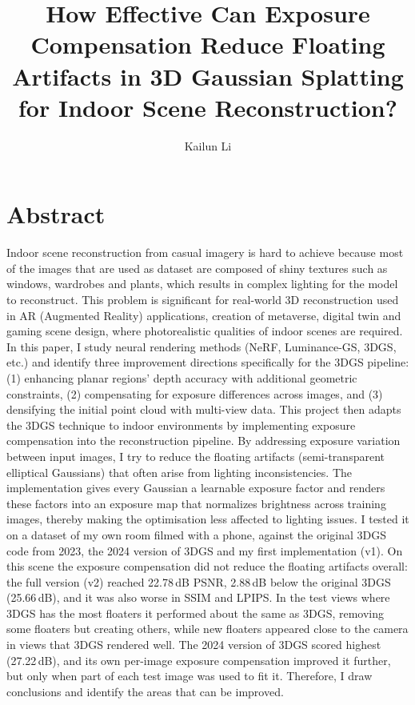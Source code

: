 \documentclass[11pt,a4paper]{article}
\title{How Effective Can Exposure Compensation Reduce Floating Artifacts in 3D Gaussian Splatting for Indoor Scene Reconstruction?}
\author{Kailun Li}
\date{}
\begin{document}
\maketitle
\thispagestyle{empty}

\tableofcontents
\clearpage

\section{Abstract}

Indoor scene reconstruction from casual imagery is hard to achieve because most of the images that are used as dataset are composed of shiny textures such as windows, wardrobes and plants, which results in complex lighting for the model to reconstruct. This problem is significant for real-world 3D reconstruction used in AR (Augmented Reality) applications, creation of metaverse, digital twin and gaming scene design, where photorealistic qualities of indoor scenes are required. In this paper, I study neural rendering methods (NeRF, Luminance-GS, 3DGS, etc.) and identify three improvement directions specifically for the 3DGS pipeline: (1) enhancing planar regions' depth accuracy with additional geometric constraints, (2) compensating for exposure differences across images, and (3) densifying the initial point cloud with multi-view data. This project then adapts the 3DGS technique to indoor environments by implementing exposure compensation into the reconstruction pipeline. By addressing exposure variation between input images, I try to reduce the floating artifacts (semi-transparent elliptical Gaussians) that often arise from lighting inconsistencies. The implementation gives every Gaussian a learnable exposure factor and renders these factors into an exposure map that normalizes brightness across training images, thereby making the optimisation less affected to lighting issues. I tested it on a dataset of my own room filmed with a phone, against the original 3DGS code from 2023, the 2024 version of 3DGS and my first implementation (v1). On this scene the exposure compensation did not reduce the floating artifacts overall: the full version (v2) reached 22.78\,dB PSNR, 2.88\,dB below the original 3DGS (25.66\,dB), and it was also worse in SSIM and LPIPS. In the test views where 3DGS has the most floaters it performed about the same as 3DGS, removing some floaters but creating others, while new floaters appeared close to the camera in views that 3DGS rendered well. The 2024 version of 3DGS scored highest (27.22\,dB), and its own per-image exposure compensation improved it further, but only when part of each test image was used to fit it. Therefore, I draw conclusions and identify the areas that can be improved.
\end{document}
